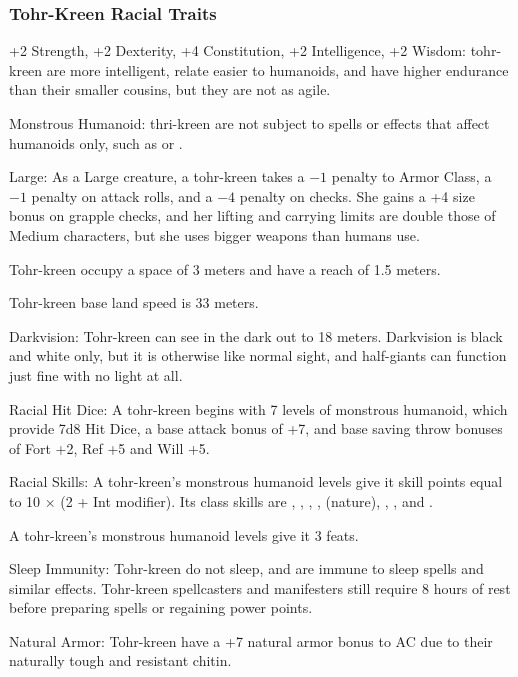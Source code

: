 
\subsubsection{Tohr-Kreen Racial Traits}
\begin{itemize*}
    \item +2 Strength, +2 Dexterity, +4 Constitution, +2 Intelligence, +2 Wisdom: tohr-kreen are more intelligent, relate easier to humanoids, and have higher endurance than their smaller cousins, but they are not as agile.
    \item Monstrous Humanoid: thri-kreen are not subject to spells or effects that affect humanoids only, such as  or .
    \item Large: As a Large creature, a tohr-kreen takes a $-1$ penalty to Armor Class, a $-1$ penalty on attack rolls, and a $-4$ penalty on  checks. She gains a +4 size bonus on grapple checks, and her lifting and carrying limits are double those of Medium characters, but she uses bigger weapons than humans use.
    \item Tohr-kreen occupy a space of 3 meters and have a reach of 1.5 meters.
    \item Tohr-kreen base land speed is 33 meters.
    \item Darkvision: Tohr-kreen can see in the dark out to 18 meters. Darkvision is black and white only, but it is otherwise like normal sight, and half-giants can function just fine with no light at all.
    \item Racial Hit Dice: A tohr-kreen begins with 7 levels of monstrous humanoid, which provide 7d8 Hit Dice, a base attack bonus of +7, and base saving throw bonuses of Fort +2, Ref +5 and Will +5.
    \item Racial Skills: A tohr-kreen's monstrous humanoid levels give it skill points equal to 10 $\times$ (2 + Int modifier). Its class skills are , , , ,  (nature), , , and .
    \item A tohr-kreen's monstrous humanoid levels give it 3 feats.
    \item Sleep Immunity: Tohr-kreen do not sleep, and are immune to sleep spells and similar effects. Tohr-kreen spellcasters and manifesters still require 8 hours of rest before preparing spells or regaining power points.
    \item Natural Armor: Tohr-kreen have a +7 natural armor bonus to AC due to their naturally tough and resistant chitin.

\end{itemize*}
